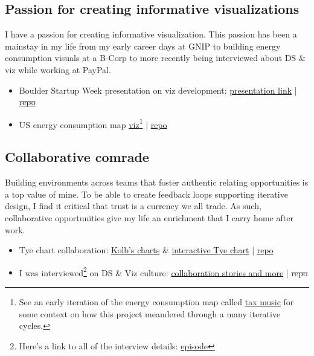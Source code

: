 \documentclass[11pt]{article}
\begin{document}
\subsection{Passion for creating informative visualizations}\label{sec:culture}
I have a passion for creating informative visualization. This passion has been a mainstay in my life from my early career days at GNIP to building energy consumption visuals at a B-Corp to more recently being interviewed about DS \& viz while working at PayPal. 

\begin{itemize}
	\item Boulder Startup Week presentation on viz development:  \href{https://blehman.github.io/2015-05-13\_BSW\_DataViz\_Lecture/\#/}{presentation link} | \sout{ \href{https://github.com/blehman/2015-05-13_BSW_DataViz_Lecture/tree/master}{repo} }
	\item US energy consumption map \href{https://blehman.github.io/wmo_map/}{viz}\footnote{See an early iteration of the energy consumption map called \href{https://blehman.github.io/tax_story/tax_sounds/}{tax music} for some context on how this project meandered through a many iterative cycles.} |  \href{https://github.com/blehman/wmo_map/tree/gh-pages}{repo} 
	
\end{itemize}


\subsection{Collaborative comrade}\label{sec:learner}
Building environments across teams that foster authentic relating opportunities is a top value of mine. To be able to create feedback loops supporting iterative design, I find it critical that trust is a currency we all trade. As such, collaborative opportunities give my life an enrichment that I carry home after work.  
 \begin{itemize}
 	\item Tye chart collaboration:  \href{https://github.com/twitterdev/Gnip-Trend-Detection}{Kolb's charts} \& \href{https://blehman.github.io/trend\_detection\_graph/}{interactive Tye chart} | \href{https://github.com/blehman/trend\_detection\_graph}{repo}
	\item I was interviewed\footnote{Here's a link to all of the interview details: \href{https://powderkeg.com/the-power-of-data-science-and-visualization-with-brian-lehman-of-honey/}{episode}} on DS \& Viz culture:  \href{https://www.youtube.com/watch?v=uIOiEL5aUe0&t=2m5s}{collaboration stories and more}  | \sout{repo}
 \end{itemize}
\end{document}
